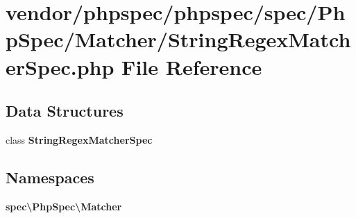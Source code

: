 \section{vendor/phpspec/phpspec/spec/\+Php\+Spec/\+Matcher/\+String\+Regex\+Matcher\+Spec.php File Reference}
\label{_string_regex_matcher_spec_8php}
\subsection*{Data Structures}
\begin{DoxyCompactItemize}
\item 
class {\bf String\+Regex\+Matcher\+Spec}
\end{DoxyCompactItemize}
\subsection*{Namespaces}
\begin{DoxyCompactItemize}
\item 
 {\bf spec\textbackslash{}\+Php\+Spec\textbackslash{}\+Matcher}
\end{DoxyCompactItemize}
